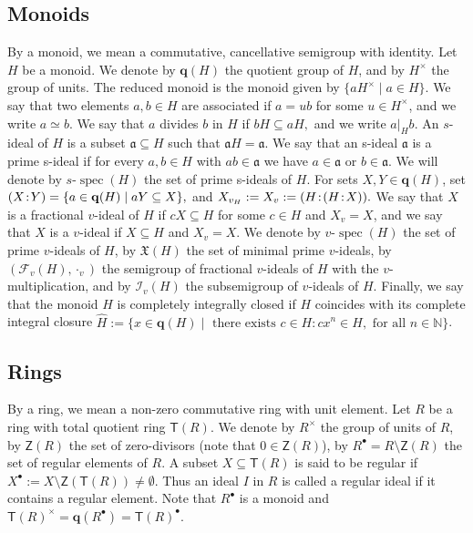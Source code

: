 \documentclass[a4paper, 10pt]{amsart}
\newcommand{\defit}[1]{{\textsf{#1}}}
\theoremstyle{plain}
\theoremstyle{definition}
\theoremstyle{remark}
\DeclareMathOperator{\spec}{spec}
\newcommand{\DP}{\negthinspace : \negthinspace}
\numberwithin{equation}{section}
\begin{document}
\subsection{Monoids} By a monoid, we mean a commutative, cancellative semigroup with identity. Let $H$ be a monoid. We denote by $\mathbf{q}(H)$ the quotient group of $H$, and by $H^\times$ the group of units. The \defit{reduced monoid} is the monoid given by $\{aH^\times\mid a\in H\}$. We say that two elements $a,b\in H$ are \defit{associated}  if $a=ub$ for some $u\in H^\times$, and we write $a\simeq b$. We say that $a$ divides $b$ in $H$ if $bH\subseteq aH,$ and we write $a|_Hb$. An $s$-\defit{ideal} of $H$ is a subset $\mathfrak{a}\subseteq H$ such that $\mathfrak{a}H=\mathfrak{a}.$ We say that an s-ideal $\mathfrak{a}$ is a \defit{prime s-ideal} if for every $a,b\in H$ with $ab\in \mathfrak{a}$ we have $a\in \mathfrak{a}$ or $b\in \mathfrak{a}.$ We will denote by $s$-$\spec(H)$ the set of prime s-ideals of $H$. For sets $X,Y\in \mathbf{q}(H)$, set $(X\DP Y)=\{a\in \mathbf{q}(H)\mid aY\subseteq X\},$ and $X_{v_H}:=X_v:=(H\DP (H\DP X)).$  We say that $X$ is a \defit{fractional} $v$-\defit{ideal} of $H$ if $cX\subseteq H$ for some $c\in H$ and $X_v=X$, and we say that $X$ is a $v$-\defit{ideal} if $X\subseteq H$ and $X_v=X.$ We denote by $v$-$\spec(H)$ the set of prime $v$-ideals of $H$, by $\mathfrak{X}(H)$ the set of minimal prime $v$-ideals, by $(\mathcal{F}_v(H),\cdot_v)$ the semigroup of fractional $v$-ideals of $H$ with the $v$-multiplication, and by $\mathcal{I}_v(H)$ the subsemigroup of $v$-ideals of $H$. Finally, we say that the monoid $H$ is \defit{completely integrally closed} if $H$ coincides with its \defit{complete integral closure} $\widehat{H}:=\{x\in\mathbf{q}(H)\mid \text{ there exists } c\in H : cx^n\in H, \text{ for all } n\in \mathbb{N}\}$.

\subsection{Rings} By a ring, we mean a non-zero commutative ring with unit element. Let $R$ be a ring with total quotient ring $\mathsf T(R)$. We denote by $R^{\times}$ the group of units of $R$, by $\mathsf Z(R)$ the set of zero-divisors (note that $0 \in \mathsf Z(R)$), by $R^{\bullet} =R \setminus \mathsf Z(R)$ the set of regular elements of $R$.
A subset $X \subseteq \mathsf T(R)$ is said to be \defit{regular} if $X^{\bullet}:=X \setminus \mathsf Z(\mathsf T(R)) \neq \emptyset$. Thus an ideal $I$ in $R$ is called a \defit{regular ideal} if it contains a regular element. Note that $R^{\bullet}$ is a monoid and $\mathsf T(R)^{\times}= \mathbf{q}(R^{\bullet})=\mathsf T(R)^{\bullet}$.
\end{document}
